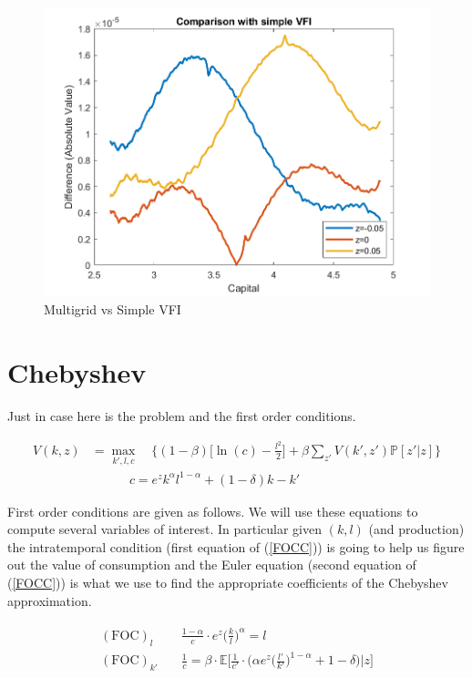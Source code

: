\documentclass[a4paper,12pt]{article}
\begin{document}
     \begin{figure}[!htbp]
       \centering
       \includegraphics{econ714_homework2_question5_plot_comparison_q2.png}
       \caption{Multigrid vs Simple VFI}
       \label{comparsion_with_VFI_q2}
   \end{figure}
    
    
    \section{Chebyshev}
    
    Just in case here is the problem and the first order conditions. 
    
    \begin{align*}
        V(k,z) & = \max_{k',l, c} \quad \bigg\{(1-\beta) \bigg[\ln(c) - \frac{l^2}{2}\bigg] + \beta \sum_{z'} V(k',z') \mathbb{P}[z'|z]\bigg\} \\ & \quad\quad\quad c=e^z k^{\alpha} l^{1-\alpha} + (1-\delta) k - k'
    \end{align*}
    
    First order conditions are given as follows. We will use these equations to compute several variables of interest. In particular given $(k,l)$ (and production) the intratemporal condition (first equation of (\ref{FOCC})) is going to help us figure out the value of consumption and the Euler equation (second equation of  (\ref{FOCC})) is what we use to find the appropriate coefficients of the Chebyshev approximation. 
    
    \begin{align}\label{FOCC}\begin{split}
        (\text{FOC})_{l}\quad &  \frac{1-\alpha}{c}\cdot e^z \bigg(\frac{k}{l}\bigg)^{\alpha}  = l \\ (\text{FOC})_{k'} \quad &  \frac{1}{c} = \beta \cdot  \mathbb{E}\bigg[\frac{1}{c'}\cdot \bigg(\alpha e^z \bigg(\frac{l'}{k'}\bigg)^{1-\alpha} + 1 - \delta \bigg)\bigg| z\bigg]\end{split}
    \end{align}
    
\end{document}
